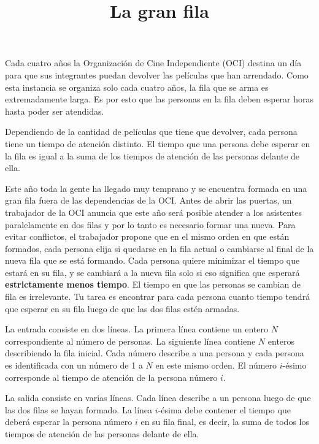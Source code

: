 \documentclass{oci}
\title{La gran fila}
\begin{document}
\maketitle

Cada cuatro años la Organización de Cine Independiente (OCI) destina un día para que sus integrantes puedan devolver las películas que han arrendado.
Como esta instancia se organiza solo cada cuatro años, la fila que se arma es extremadamente larga.
Es por esto que las personas en la fila deben esperar horas hasta poder ser atendidas.

Dependiendo de la cantidad de películas que tiene que devolver, cada persona tiene un tiempo de atención distinto.
El tiempo que una persona debe esperar en la fila es igual a la suma de los tiempos de atención de las personas delante de ella.

Este año toda la gente ha llegado muy temprano y se encuentra formada en una gran fila fuera de las dependencias de la OCI.
Antes de abrir las puertas, un trabajador de la OCI anuncia que este año será posible atender a los asistentes paralelamente en dos filas y por lo tanto es necesario formar una nueva.
Para evitar conflictos, el trabajador propone que en el mismo orden en que están formados, cada persona elija si quedarse en la fila actual o cambiarse al final de la nueva fila que se está formando.
Cada persona quiere minimizar el tiempo que estará en su fila, y se cambiará a la nueva fila solo si eso significa que esperará {\bf estrictamente menos tiempo}.
El tiempo en que las personas se cambian de fila es irrelevante.
Tu tarea es encontrar para cada persona cuanto tiempo tendrá que esperar en su fila luego de que las dos filas estén armadas.

\begin{inputDescription}
  La entrada consiste en dos líneas.
La primera línea contiene un entero $N$ correspondiente al número de personas.
La siguiente línea contiene $N$ enteros describiendo la fila inicial.
Cada número describe a una persona y cada persona es identificada con un número de 1 a $N$ en este mismo orden.
El número $i$-ésimo corresponde al tiempo de atención de la persona número $i$.
\end{inputDescription}

\begin{outputDescription}
  La salida consiste en varias líneas.
  Cada línea describe a un persona luego de que las dos filas se hayan formado.
  La línea $i$-ésima debe contener el tiempo que deberá esperar la persona número $i$ en su fila final, es decir, la suma de todos los tiempos de atención de las personas delante de ella.
\end{outputDescription}
\end{document}
